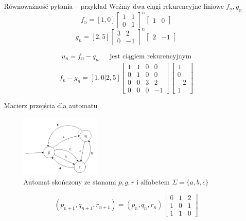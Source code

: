 \documentclass[handout]{beamer}
\theoremstyle{definition}
\theoremstyle{named}
\begin{document}
\begin{frame}{Równoważność pytania -- przykład}
Weźmy dwa ciągi rekurencyjne liniowe $f_n, g_n$
    \begin{equation*}
        f_{n} = [1,0] \begin{bmatrix}
            1 & 1 \\
            0 & 1 
        \end{bmatrix}^{n}
        \begin{bmatrix}
            1 & 0
        \end{bmatrix}
    \end{equation*}
    \begin{equation*}
         g_{n} = [2,5] \begin{bmatrix}
            3 & 2 \\
            0 & -1 
        \end{bmatrix}^{n}
        \begin{bmatrix}
            2 & -1
        \end{bmatrix}
    \end{equation*}
    
    \begin{align*}
        u_n = f_n - q_n && \text{jest ciągiem rekurencyjnym} 
    \end{align*}
    $$
        f_n - g_n = [1,0|2,5] 
        \left[
        \begin{array}{cc|cc}
        1 & 1 & 0 & 0 \\
        0 & 1 & 0 & 0 \\
        \hline
        0 & 0 & 3 & 2 \\
        0 & 0 & 0 & -1
        \end{array}
        \right]
        \begin{bmatrix}
            1  \\
            0  \\
            \hline
            -2 \\
            1 
        \end{bmatrix}
    $$
    
\end{frame}

\begin{frame}{Macierz przejścia dla automatu}
\begin{figure}
    \centering
    \includegraphics[width=40mm]{img/automat.png}
    \caption{Automat skończony ze stanami $p, g, r$ i alfabetem $\Sigma = \{a,b,c \}$}
    \label{fig:my_label}
\end{figure}
    $$
    (p_{n+1}, q_{n+1}, r_{n+1}) 
    = (p_{n},q_{n},r_{n}) \begin{bmatrix}
    0 & 1 & 2 \\
    1 & 0 & 1 \\
    1 & 1 & 0
    \end{bmatrix}
    $$
\end{frame}
\end{document}
